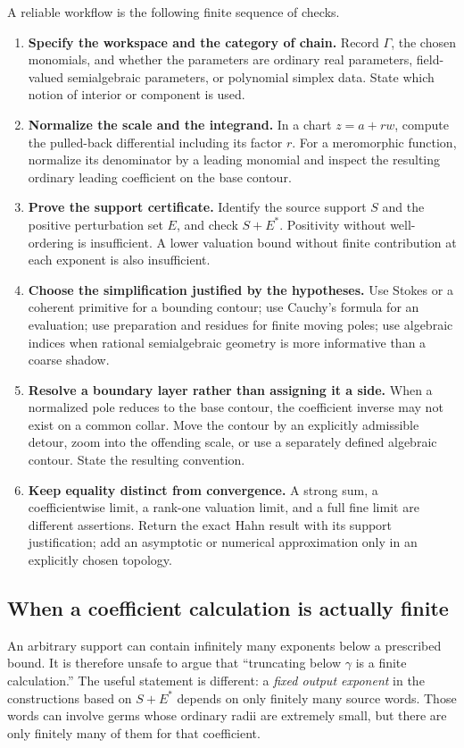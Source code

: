 \documentclass[11pt,letterpaper]{article}
\theoremstyle{definition}
\theoremstyle{remark}
\numberwithin{equation}{section}
\begin{document}
A reliable workflow is the following finite sequence of checks.
\begin{enumerate}
\item \textbf{Specify the workspace and the category of chain.} Record $\Gamma$, the chosen monomials, and whether the parameters are ordinary real parameters, field-valued semialgebraic parameters, or polynomial simplex data. State which notion of interior or component is used.
\item \textbf{Normalize the scale and the integrand.} In a chart $z=a+rw$, compute the pulled-back differential including its factor $r$. For a meromorphic function, normalize its denominator by a leading monomial and inspect the resulting ordinary leading coefficient on the base contour.
\item \textbf{Prove the support certificate.} Identify the source support $S$ and the positive perturbation set $E$, and check $S+E^*$. Positivity without well-ordering is insufficient. A lower valuation bound without finite contribution at each exponent is also insufficient.
\item \textbf{Choose the simplification justified by the hypotheses.} Use Stokes or a coherent primitive for a bounding contour; use Cauchy's formula for an evaluation; use preparation and residues for finite moving poles; use algebraic indices when rational semialgebraic geometry is more informative than a coarse shadow.
\item \textbf{Resolve a boundary layer rather than assigning it a side.} When a normalized pole reduces to the base contour, the coefficient inverse may not exist on a common collar. Move the contour by an explicitly admissible detour, zoom into the offending scale, or use a separately defined algebraic contour. State the resulting convention.
\item \textbf{Keep equality distinct from convergence.} A strong sum, a coefficientwise limit, a rank-one valuation limit, and a full fine limit are different assertions. Return the exact Hahn result with its support justification; add an asymptotic or numerical approximation only in an explicitly chosen topology.
\end{enumerate}

\subsection{When a coefficient calculation is actually finite}
An arbitrary support can contain infinitely many exponents below a prescribed bound. It is therefore unsafe to argue that ``truncating below $\gamma$ is a finite calculation.'' The useful statement is different: a \emph{fixed output exponent} in the constructions based on $S+E^*$ depends on only finitely many source words. Those words can involve germs whose ordinary radii are extremely small, but there are only finitely many of them for that coefficient.
\end{document}
